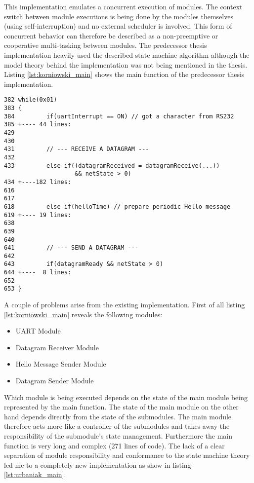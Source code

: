 This implementation emulates a concurrent execution of modules. The context switch between module executions is being done by the modules themselves (using self-interruption) and no external scheduler is involved. This form of concurrent behavior can therefore be described as a non-preemptive or cooperative multi-tasking between modules. The predecessor thesis \cite{korniowski} implementation heavily used the described state machine algorithm although the model theory behind the implementation was not being mentioned in the thesis. Listing \ref{lst:korniowski_main} shows the main function of the predecessor thesis implementation.

\begin{lstlisting}[label=lst:korniowski_main,caption=main function implementation in \cite{korniowski}]
382 while(0x01)
383 {
384         if(uartInterrupt == ON) // got a character from RS232
385 +---- 44 lines: 
429 
430 
431         // --- RECEIVE A DATAGRAM ---
432 
433         else if((datagramReceived = datagramReceive(...)) 
                    && netState > 0)     
434 +----182 lines: 
616 
617     
618         else if(helloTime) // prepare periodic Hello message
619 +---- 19 lines: 
638 
639 
640     
641         // --- SEND A DATAGRAM ---
642     
643         if(datagramReady && netState > 0)
644 +----  8 lines: 
652 
653 }
\end{lstlisting}

A couple of problems arise from the existing implementation. First of all listing \ref{lst:korniowski_main} reveals the following modules:

\begin{itemize}
\item UART Module
\item Datagram Receiver Module
\item Hello Message Sender Module
\item Datagram Sender Module
\end{itemize}

Which module is being executed depends on the state of the main module being represented by the main function. The state of the main module on the other hand depends directly from the state of the submodules. The main module therefore acts more like a controller of the submodules and takes away the responsibility of the submodule's state management. Furthermore the main function is very long and complex (271 lines of code). The lack of a clear separation of module responsibility and conformance to the state machine theory led me to a completely new implementation as show in listing \ref{lst:urbaniak_main}.

